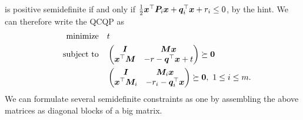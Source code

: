 \documentclass{article}
\begin{document}
is positive semidefinite if and only if $\frac{1}{2}\bm{x}^{\top}\bm{P}_i\bm{x}+\bm{q}_i^{\top}\bm{x}+r_i\leq 0$, by the hint. We can therefore write the QCQP as
\begin{align*}
\text{minimize}\quad & t\\
\quad\text{subject to}\quad & \begin{pmatrix}
  \bm{I} & \bm{M}\bm{x}\\
  \bm{x}^{\top}\bm{M} & -r-\bm{q}^{\top}\bm{x}+t
 \end{pmatrix}\succeq \bm{0}\\
 & \begin{pmatrix}
  \bm{I} & \bm{M}_i\bm{x}\\
  \bm{x}^{\top}\bm{M}_i & -r_i-\bm{q}_i^{\top}\bm{x}
 \end{pmatrix}\succeq \bm{0}, \ 1\leq i\leq m.
\end{align*}
We can formulate several semidefinite constraints as one by assembling the above matrices as diagonal blocks of a big matrix.
%
\end{document}
